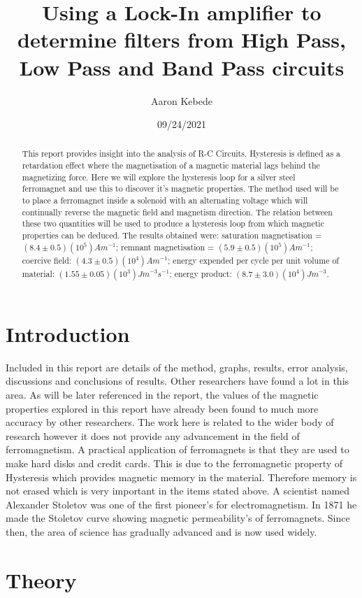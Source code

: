 \documentclass[a4paper]{article}\usepackage[english]{babel}
\title{Using a Lock-In amplifier to determine filters from High Pass, Low Pass and Band Pass circuits }
\author{Aaron Kebede}
\date{09/24/2021}
\begin{document}
\maketitle
\begin{abstract}
This report provides insight into the analysis of R-C Circuits. Hysteresis is defined as a retardation effect where the magnetisation of a magnetic material lags behind the magnetizing force. Here we will explore the hysteresis loop for a silver steel ferromagnet and use this to discover it’s magnetic properties. The method used will be to place a ferromagnet inside a solenoid with an alternating voltage which will continually reverse the magnetic field and magnetism direction. The relation between these two quantities will be used to produce a hysteresis loop from which magnetic properties can be deduced. 
The results obtained were: saturation magnetisation = $(8.4±0.5)(10^5)Am^{-1}$; remnant magnetisation = $(5.9±0.5)(10^5)Am^{-1}$; coercive field: $(4.3±0.5)(10^4)Am^{-1}$; energy expended per cycle per unit volume of material: $(1.55±0.05)(10^3)Jm^{-3}s^{-1}$; energy product: $(8.7±3.0)(10^4)Jm^{-3}$.

\end{abstract}

\section{Introduction}

Included in this report are details of the method, graphs, results, error analysis, discussions and conclusions of results.
Other researchers have found a lot in this area. As will be later referenced in the report, the values of the magnetic properties explored in this report have already been found to much more accuracy by other researchers.
The work here is related to the wider body of research however it does not provide any advancement in the field of ferromagnetism.
A practical application of ferromagnets is that they are used to make hard disks and credit cards. This is due to the ferromagnetic property of Hysteresis which provides magnetic memory in the material. Therefore memory is not erased which is very important in the items stated above.
A scientist named Alexander Stoletov was one of the first pioneer’s for electromagnetism. In 1871 he made the Stoletov curve showing magnetic permeability’s of ferromagnets. Since then, the area of science has gradually advanced and is now used widely.

\section{Theory}
\end{document}
